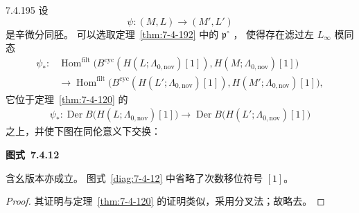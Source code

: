 \begin{theorem}{7.4.195}\label{thm:7-4-195}
设
\[
\psi\colon(M,L)\longrightarrow(M',L')
\]
是辛微分同胚。
可以选取定理~\ref{thm:7-4-192} 中的 $\mathfrak p^\circ$
，
使得存在滤过左 $L_\infty$ 模同态
\[
\begin{aligned}
\psi_*\colon{}&
\operatorname{Hom}^{\mathrm{filt}}
\bigl(
B^{\mathrm{cyc}}(H(L;\Lambda_{0,\mathrm{nov}})[1]),
H(M;\Lambda_{0,\mathrm{nov}})[1]
\bigr)\\
&\longrightarrow
\operatorname{Hom}^{\mathrm{filt}}
\bigl(
B^{\mathrm{cyc}}(H(L';\Lambda_{0,\mathrm{nov}})[1]),
H(M';\Lambda_{0,\mathrm{nov}})[1]
\bigr),
\end{aligned}
\]
它位于定理~\ref{thm:7-4-120} 的
\[
\begin{aligned}
\psi_*\colon
\operatorname{Der}B
\bigl(H(L;\Lambda_{0,\mathrm{nov}})[1]\bigr)
\longrightarrow
\operatorname{Der}B
\bigl(H(L';\Lambda_{0,\mathrm{nov}})[1]\bigr)
\end{aligned}
\]
之上，并使下图在同伦意义下交换：

\par\medskip\noindent\begin{minipage}{\textwidth}
\centering
{}
\par\smallskip
{\renewcommand{\thefigure}{7.4.12}
\normalfont\bfseries 图式~\thefigure\label{diag:7-4-12}}
\end{minipage}\par\medskip

含幺版本亦成立。
图式~\ref{diag:7-4-12} 中省略了次数移位符号 $[1]$。
\end{theorem}

\begin{proof}
其证明与定理~\ref{thm:7-4-120} 的证明类似，采用分叉法；故略去。
\end{proof}

